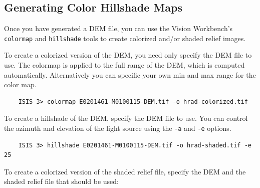 %

\subsection{Generating Color Hillshade Maps}

Once you have generated a \ac{DEM} file, you can use the Vision Workbench's
\texttt{colormap} and \texttt{hillshade} tools to create colorized
and/or shaded relief images.

To create a colorized version of the \ac{DEM}, you need only specify
the \ac{DEM} file to use. The colormap is applied to the full range of
the DEM, which is computed automatically.  Alternatively you can
specific your own min and max range for the color map.

\begin{verbatim}
    ISIS 3> colormap E0201461-M0100115-DEM.tif -o hrad-colorized.tif
\end{verbatim}

To create a hillshade of the \ac{DEM}, specify the \ac{DEM} file to
use. You can control the azimuth and elevation of the light source
using the \texttt{-a} and \texttt{-e} options.

\begin{verbatim}
    ISIS 3> hillshade E0201461-M0100115-DEM.tif -o hrad-shaded.tif -e 25
\end{verbatim}

To create a colorized version of the shaded relief file, specify
the \ac{DEM} and the shaded relief file that should be used:

